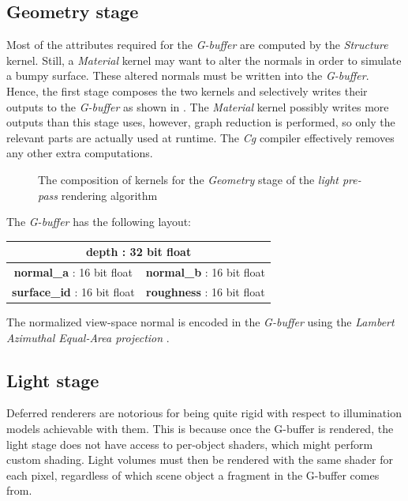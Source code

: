 \subsection{Geometry stage}

Most of the attributes required for the \emph{G-buffer} are computed by the \emph{Structure} kernel. Still, a \emph{Material} kernel may want to alter the normals in order to simulate a bumpy surface. These altered normals must be written into the \emph{G-buffer}. Hence, the first stage composes the two kernels and selectively writes their outputs to the \emph{G-buffer} as shown in . The \emph{Material} kernel possibly writes more outputs than this stage uses, however, graph reduction is performed, so only the relevant parts are actually used at runtime. The \emph{Cg} compiler effectively removes any other extra computations.

\begin{figure}[ht!]
  \centering
    \caption[Light Pre-Pass Stage 1]{The composition of kernels for the \emph{Geometry} stage of the  \emph{light pre-pass} rendering algorithm}
  \label{fig:DeferredLightingStage1}
\end{figure}

The \emph{G-buffer} has the following layout:

\begin{center}
\begin{tabular}{ | c | c | }
\hline
\multicolumn{2}{|c|}{ \textbf{depth} : 32 bit float } \\
\hline
\textbf{normal\_a} : 16 bit float & \textbf{normal\_b} : 16 bit float \\
\hline
\textbf{surface\_id} : 16 bit float & \textbf{roughness} : 16 bit float \\
\hline
\end{tabular}
\end{center}

The normalized view-space normal is encoded in the \emph{G-buffer} using the \emph{Lambert Azimuthal Equal-Area projection} \cite{ArasNormalStorage}.

\subsection{Light stage}

Deferred renderers are notorious for being quite rigid with respect to illumination models achievable with them. This is because once the G-buffer is rendered, the light stage does not have access to per-object shaders, which might perform custom shading. Light volumes must then be rendered with the same shader for each pixel, regardless of which scene object a fragment in the G-buffer comes from.

